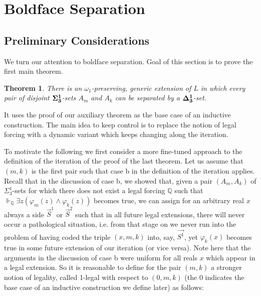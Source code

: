 \documentclass[a4paper,11pt]{article}
\newtheorem{theorem}{Theorem}[section]
\newcommand{\forceQ}{\mathbb{Q}}
\begin{document}
\section{Boldface Separation}
\subsection{Preliminary Considerations}
We turn our attention to boldface separation. Goal of this section is to prove the first main theorem.
\begin{theorem}
There is an $\omega_1$-preserving, generic extension of $L$ in which every pair of disjoint $\bf{\Sigma^1_3}$-sets $A_m$ and $A_k$ can be separated by a $\bf{\Delta^1_3}$-set.
\end{theorem}
It uses the proof of our auxiliary theorem as the base case of an inductive construction. The main idea to keep control is to replace the notion of legal forcing with a dynamic variant which keeps changing along the iteration.

To motivate the following we first consider a more fine-tuned approach to the definition of the iteration of the proof of the last theorem. Let us assume that $(m,k)$ is the first pair such that case b in the definition of the iteration applies. Recall that in the discussion of case b, we showed that, given a pair $(A_m, A_k)$ of $\Sigma^1_3$-sets for which there does not exist a legal forcing $\forceQ$ such that $\Vdash_{\forceQ} \exists z (\varphi_m(z) \land \varphi_k(z))$ becomes true, we can assign for an arbitrary real $x$ always a side $\vec{S}^1$ or $\vec{S}^2$ such that in all future legal extensions, there will never occur a pathological situation, i.e. from that stage on we never run into the problem of having coded the triple $(x,m,k)$ into, say, $\vec{S^1}$, yet $\varphi_k(x)$ becomes true in some future extension of our iteration (or vice versa). Note here that the arguments in the discussion of case b were uniform for all reals $x$ which appear in a legal extension. So it is reasonable to define for the pair $(m,k)$ 
a stronger notion of legality, called 1-legal with respect to $(0,m,k)$ (the 0 indicates the base case of an inductive construction we define later) as follows:
\end{document}
